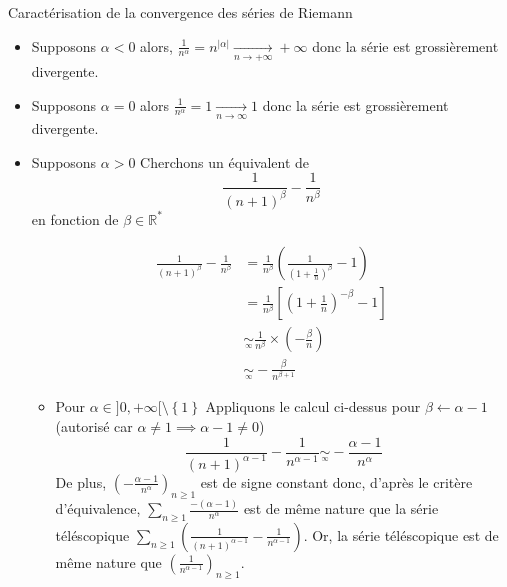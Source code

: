 \documentclass{article}
\begin{document}
\begin{question_kholle}{Caractérisation de la convergence des séries de Riemann}
    \begin{itemize}[label=$\lozenge$]
        \item Supposons $\alpha < 0$ alors, $\frac{1}{n^{\alpha}}=n^{\lvert \alpha \rvert} \xrightarrow[n\to +\infty]{}+\infty$ donc la série est grossièrement divergente.
        \item Supposons $\alpha = 0$ alors $\frac{1}{n^{\alpha}}=1 \xrightarrow[n \to \infty]{} 1$ donc la série est grossièrement divergente.
        \item Supposons $\alpha > 0$
        Cherchons un équivalent de 
$$
        \frac{1}{(n+1)^{\beta}}-\frac{1}{n^{\beta}}
$$
        en fonction de $\beta \in \mathbb{R}^{*}$
        
        \begin{align*}
            \frac{1}{(n+1)^{\beta}} - \frac{1}{n^{\beta}} &= 
            \frac{1}{n^{\beta}}\left( \frac{1}{\left( 1+\frac{1}{n} \right)^{\beta}} - 1 \right) \\
            &= \frac{1}{n^{\beta}}\left[ \left( 1+\frac{1}{n} \right)^{-\beta} - 1\right]  \\
            &\underset{ \overset {\infty} {} } {\sim} \frac{1}{n^{\beta}} \times \left( -\frac{\beta}{n} \right) \\
            &\underset{ \overset {\infty} {} } {\sim} - \frac{\beta}{n^{\beta+1}}
        \end{align*}
        
        \begin{itemize}[label=$\star$]
            \item Pour $\alpha \in ]0, +\infty[ \setminus \left\{ 1 \right\}$
            Appliquons le calcul ci-dessus pour $\beta \leftarrow \alpha -1$ (autorisé car $\alpha \neq 1\implies \alpha-1 \neq 0$)
            $$\frac{1}{(n+1)^{\alpha-1}}-\frac{1}{n^{\alpha-1}} \underset{ \overset {\infty} {} } {\sim}
            -\frac{\alpha-1}{n^{\alpha}}$$
            De plus, $\left( -\frac{\alpha-1}{n^{\alpha}} \right)_{n\geqslant 1}$ est de signe constant donc, d'après le critère d'équivalence, $\sum_{n\geqslant 1} \frac{-(\alpha -1)}{n^{\alpha}}$ est de même nature que la série téléscopique $\sum_{n\geqslant 1}(\frac{1}{(n+1)^{\alpha-1}}-\frac{1}{n^{\alpha-1}} )$. Or, la série téléscopique est de même nature que $\left( \frac{1}{n^{\alpha-1}} \right)_{n\geqslant 1}$.
            

\end{itemize}
\end{itemize}
\end{question_kholle}
\end{document}

